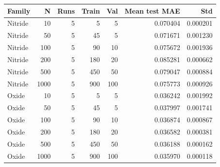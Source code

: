 \begin{tabular}{lrrrrrr}
\toprule
Family & N & Runs & Train & Val & Mean test MAE & Std \\
\midrule
Nitride & 10 & 5 & 5 & 5 & 0.070404 & 0.000201 \\
Nitride & 50 & 5 & 45 & 5 & 0.071671 & 0.001230 \\
Nitride & 100 & 5 & 90 & 10 & 0.075672 & 0.001936 \\
Nitride & 200 & 5 & 180 & 20 & 0.085281 & 0.000662 \\
Nitride & 500 & 5 & 450 & 50 & 0.079047 & 0.000884 \\
Nitride & 1000 & 5 & 900 & 100 & 0.075773 & 0.000926 \\
Oxide & 10 & 5 & 5 & 5 & 0.036242 & 0.001992 \\
Oxide & 50 & 5 & 45 & 5 & 0.037997 & 0.001741 \\
Oxide & 100 & 5 & 90 & 10 & 0.036874 & 0.000867 \\
Oxide & 200 & 5 & 180 & 20 & 0.036582 & 0.000381 \\
Oxide & 500 & 5 & 450 & 50 & 0.036188 & 0.000162 \\
Oxide & 1000 & 5 & 900 & 100 & 0.035970 & 0.000118 \\
\bottomrule
\end{tabular}

